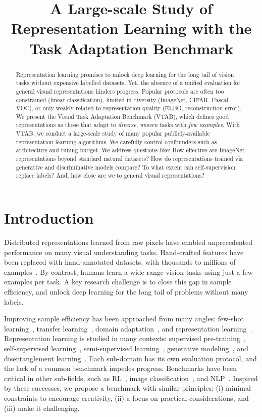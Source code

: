 \title{A Large-scale Study of Representation Learning with the Task Adaptation Benchmark}

\begin{abstract}
Representation learning promises to unlock deep learning for the long tail of vision tasks without expensive labelled datasets. Yet, the absence of a unified evaluation for general visual representations hinders progress. Popular protocols are often too constrained (linear classification), limited in diversity (ImageNet, CIFAR, Pascal-VOC), or only weakly related to representation quality (ELBO, reconstruction error). We present the Visual Task Adaptation Benchmark (VTAB), which defines good representations as those that adapt to \emph{diverse}, \emph{unseen} tasks with \emph{few examples}. With VTAB, we conduct a large-scale study of many popular publicly-available representation learning algorithms. We carefully control confounders such as architecture and tuning budget. We address questions like: How effective are ImageNet representations beyond standard natural datasets? How do representations trained via generative and discriminative models compare? To what extent can self-supervision replace labels? And, how close are we to general visual representations?
\end{abstract}

\section{Introduction}

Distributed representations learned from raw pixels have enabled unprecedented performance on many visual understanding tasks. Hand-crafted features have been replaced with hand-annotated datasets, with thousands to millions of examples~\citep{cifar10,imagenet}. By contrast, humans learn a wide range vision tasks using just a few examples per task. A key research challenge is to close this gap in sample efficiency, and unlock deep learning for the long tail of problems without many labels.

Improving sample efficiency has been approached from many angles: few-shot learning~\citep{li2006}, transfer learning~\citep{pan2009survey}, domain adaptation~\citep{wang2018deep}, and representation learning~\citep{bengio2013representation}. Representation learning is studied in many contexts: supervised pre-training~\citep{razavian2014}, self-supervised learning~\citep{doersch2015unsupervised}, semi-supervised learning~\citep{chapelle2009semi}, generative modeling~\citep{donahue2016adversarial}, and disentanglement learning~\citep{higgins2017beta}. Each sub-domain has its own evaluation protocol, and the lack of a common benchmark impedes progress. Benchmarks have been critical in other sub-fields, such as RL~\citep{atari}, image classification~\citep{imagenet}, and NLP~\citep{glue}. Inspired by these successes, we propose a benchmark with similar principles: (i) minimal constraints to encourage creativity, (ii) a focus on practical considerations, and (iii) make it challenging.

